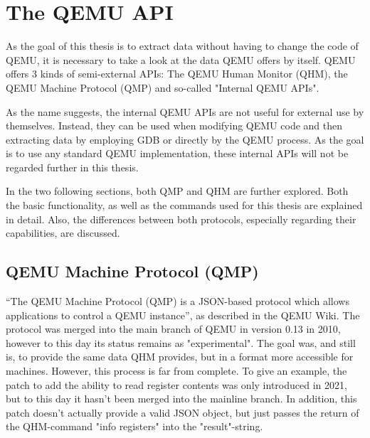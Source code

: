 
\chapter{The QEMU API} \label{chap:QEMU_API}
As the goal of this thesis is to extract data without having to change the code of QEMU,
it is necessary to take a look at the data QEMU offers by itself.
QEMU offers 3 kinds of semi-external APIs: The QEMU Human Monitor (QHM),
the QEMU Machine Protocol (QMP) and so-called "Internal QEMU APIs"\cite{internal}.

As the name suggests, the internal QEMU APIs are not useful for external use by themselves.
Instead, they can be used when modifying QEMU code and then extracting data by employing GDB or directly by the QEMU process.
As the goal is to use any standard QEMU implementation, these internal APIs will not be regarded further in this thesis.

In the two following sections, both QMP and QHM are further explored. Both the basic functionality,
as well as the commands used for this thesis are explained in detail.
Also, the differences between both protocols, especially regarding their capabilities,
are discussed.

\section{QEMU Machine Protocol (QMP)} \label{sec:QMP}
\enquote{The QEMU Machine Protocol (QMP) is a JSON-based protocol which allows applications to control a QEMU instance}\cite{qmp-description}, as described in the QEMU Wiki.
The protocol was merged into the main branch of QEMU in version 0.13 in 2010, however to this day its status remains as "experimental"\cite{qmp-merge}.
The goal was, and still is, to provide the same data QHM provides, but in a format more accessible for machines.
However, this process is far from complete. To give an example, the patch to add the ability to read register contents was only introduced in 2021,
but to this day it hasn't been merged into the mainline branch.
In addition, this patch doesn't actually provide a valid JSON object, but just passes the return of the QHM-command "info registers" into the "result"-string\cite{qmp-registers-patch}.

